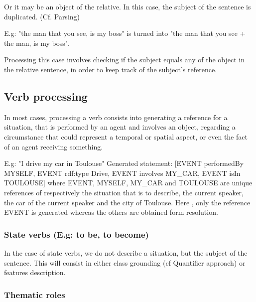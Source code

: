 \documentclass[twoside,a4paper,10pt]{report}
\begin{document}
Or it may be an object of the relative. In this case, the subject of the sentence is duplicated. (Cf. Parsing)


\small
\begin{verbatimtab}
  
  E.g: "the man that you see, is my boss" is turned into "the man that you see + the man, is my
boss".
  
\end{verbatimtab}
\normalsize

Processing this case involves checking if the subject equals any of the object in the relative sentence, in order to keep track of the subject's reference.


\subsection{Verb processing}
\label{d579d8cc3406c0556913bbaac7ee85e6}%
In most cases, processing a verb consists into generating a reference for a situation, that is performed by an agent and involves an object, regarding a circumstance that could represent a temporal or spatial aspect, or even the fact of an agent receiving something.


\small
\begin{verbatimtab}
  
  E.g: "I drive my car in Toulouse"
  Generated statement:
      [EVENT performedBy MYSELF, EVENT rdf:type Drive, EVENT involves MY_CAR, EVENT isIn TOULOUSE]
  where EVENT, MYSELF, MY_CAR and TOULOUSE are unique references of respectively the situation that
is to describe, the current speaker, the car of the current speaker and the city of Toulouse.
  Here , only the reference EVENT is generated whereas the others are obtained form resolution.
  
      
\end{verbatimtab}
\normalsize

\subsubsection{State verbs (E.g: to be, to become)}

In the case of state verbs, we do not describe a situation, but the subject of the sentence. This will consist in either class grounding (cf Quantifier approach) or features description.


\subsubsection{Thematic roles}
\end{document}
